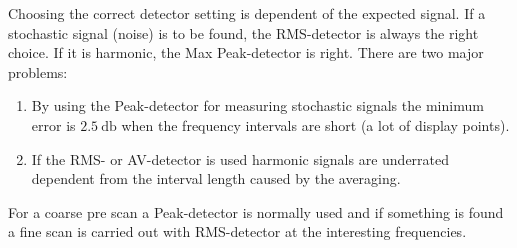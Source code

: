 Choosing the correct detector setting is dependent of the expected signal. If a stochastic signal (noise) is to be found, the \ac{RMS}-detector is always the right choice. If it is harmonic, the Max Peak-detector is right. There are two major problems:

\begin{enumerate}
\item By using the Peak-detector for measuring stochastic signals the minimum error is $\SI{2.5}{\decibel}$ when the frequency intervals are short (a lot of display points).
\item If the \ac{RMS}- or AV-detector is used harmonic signals are underrated dependent from the interval length caused by the averaging.
\end{enumerate} 

For a coarse pre scan a Peak-detector is normally used and if something is found a fine scan is carried out with \ac{RMS}-detector at the interesting frequencies.


